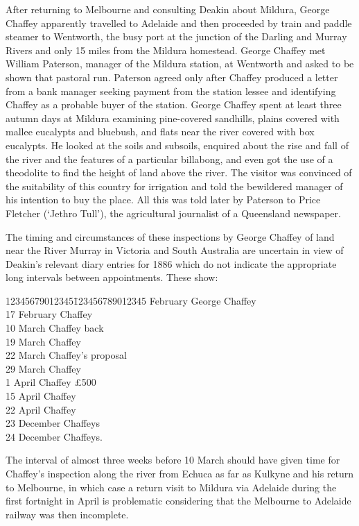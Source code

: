 After returning to Melbourne and consulting Deakin about Mildura,
George Chaffey apparently travelled to Adelaide and then proceeded by
train and paddle steamer to Wentworth, the busy port at the junction
of the Darling and Murray Rivers and only 15 miles from the Mildura
homestead.  George Chaffey met William Paterson, manager of the
Mildura station, at Wentworth and asked to be shown that pastoral run.
Paterson agreed only after Chaffey produced a letter from a bank
manager seeking payment from the station lessee and identifying
Chaffey as a probable buyer of the station.  George Chaffey spent at
least three autumn days at Mildura examining pine-covered sandhills,
plains covered with mallee eucalypts and bluebush, and flats near the
river covered with box eucalypts.  He looked at the soils and
subsoils, enquired about the rise and fall of the river and the
features of a particular billabong, and even got the use of a
theodolite to find the height of land above the river.  The visitor
was convinced of the suitability of this country for irrigation and
told the bewildered manager of his intention to buy the place.  All
this was told later by Paterson to Price Fletcher (`Jethro Tull'), the
agricultural journalist of a Queensland
newspaper.

The timing and circumstances of these inspections by George Chaffey of
land near the River Murray in Victoria and South Australia are
uncertain in view of Deakin's relevant diary entries for 1886 which do
not indicate the appropriate long intervals between appointments.
These show:
\begin{tabbing}
        12345679012345\=123456789012345 February \> George Chaffey\\
	17 February \> Chaffey\\
	10 March    \> Chaffey back\\
	19 March    \> Chaffey \\
	22 March    \> Chaffey's proposal \\
	29 March    \> Chaffey \\
	 1 April    \> Chaffey \pounds500 \\
	15 April    \> Chaffey \\
	22 April    \> Chaffey \\
	23 December \> Chaffeys \\
	24 December \> Chaffeys.\\
\end{tabbing}
The interval of almost three weeks before 10 March should have given
time for Chaffey's inspection along the river from Echuca as far as
Kulkyne and his return to Melbourne, in which case a return visit to
Mildura via Adelaide during the first fortnight in April is
problematic considering that the Melbourne to Adelaide railway was
then incomplete.

